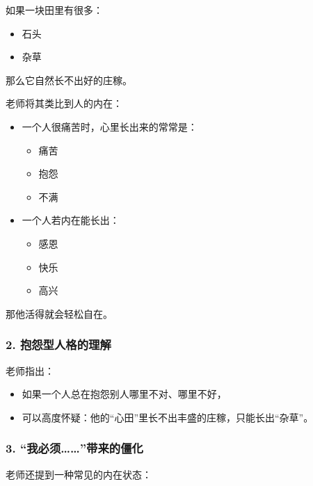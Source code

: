\documentclass[
  chinese,
  9pt,
  a4paper,
]{ctexart}
\providecommand{\tightlist}{%
  \setlength{\itemsep}{0pt}\setlength{\parskip}{0pt}}
\begin{document}
如果一块田里有很多：

\begin{itemize}
\tightlist
\item
  石头
\item
  杂草
\end{itemize}

那么它自然长不出好的庄稼。

老师将其类比到人的内在：

\begin{itemize}
\item
  一个人很痛苦时，心里长出来的常常是：

  \begin{itemize}
  \tightlist
  \item
    痛苦
  \item
    抱怨
  \item
    不满
  \end{itemize}
\item
  一个人若内在能长出：

  \begin{itemize}
  \tightlist
  \item
    感恩
  \item
    快乐
  \item
    高兴
  \end{itemize}
\end{itemize}

那他活得就会轻松自在。

\subsubsection{2.
抱怨型人格的理解}\label{ux62b1ux6028ux578bux4ebaux683cux7684ux7406ux89e3}

老师指出：

\begin{itemize}
\tightlist
\item
  如果一个人总在抱怨别人哪里不对、哪里不好，
\item
  可以高度怀疑：他的``心田''里长不出丰盛的庄稼，只能长出``杂草''。
\end{itemize}

\subsubsection{\texorpdfstring{3.
``我必须\ldots\ldots{}''带来的僵化}{3. ``我必须\ldots\ldots''带来的僵化}}\label{ux6211ux5fc5ux987bux5e26ux6765ux7684ux50f5ux5316}

老师还提到一种常见的内在状态：
\end{document}
